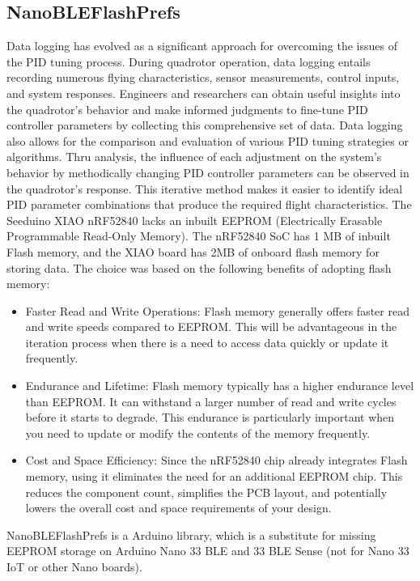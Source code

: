 \subsection{NanoBLEFlashPrefs}
Data logging has evolved as a significant approach for overcoming the issues of the PID tuning process. \cite{PIDlog}
During quadrotor operation, data logging entails recording numerous flying characteristics, sensor measurements, control inputs, and system responses.
Engineers and researchers can obtain useful insights into the quadrotor's behavior and make informed judgments to fine-tune PID controller parameters by collecting this comprehensive set of data. \cite{loggingProof}
Data logging also allows for the comparison and evaluation of various PID tuning strategies or algorithms. 
Thru analysis, the influence of each adjustment on the system's behavior by methodically changing PID controller parameters can be observed in the quadrotor's response.
This iterative method makes it easier to identify ideal PID parameter combinations that produce the required flight characteristics.
The Seeduino XIAO nRF52840 lacks an inbuilt EEPROM (Electrically Erasable Programmable Read-Only Memory). The nRF52840 SoC has 1 MB of inbuilt Flash memory, and the XIAO board has 2MB of onboard flash memory for storing data. The choice was based on the following benefits of adopting flash memory:
\begin{itemize}
    \item
        Faster Read and Write Operations: Flash memory generally offers faster read and write speeds compared to EEPROM.\cite{Sandeep} This will be advantageous in the iteration process when there is a need to access data quickly or update it frequently.
    \item
    	Endurance and Lifetime: Flash memory typically has a higher endurance level than EEPROM. It can withstand a larger number of read and write cycles before it starts to degrade.\cite{Sandeep} This endurance is particularly important when you need to update or modify the contents of the memory frequently.
    \item
    	Cost and Space Efficiency: Since the nRF52840 chip already integrates Flash memory, using it eliminates the need for an additional EEPROM chip. This reduces the component count, simplifies the PCB layout, and potentially lowers the overall cost and space requirements of your design.
\end{itemize}
NanoBLEFlashPrefs is a Arduino library, which is a substitute for missing EEPROM storage on Arduino Nano 33 BLE and 33 BLE Sense (not for Nano 33 IoT or other Nano boards). \cite{FlashPrefs}
